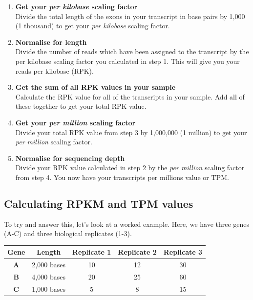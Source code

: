 \documentclass[11pt]{article}
\begin{document}
\begin{enumerate}
\def\labelenumi{\arabic{enumi}.}
\item
  \textbf{Get your \textit{per kilobase} scaling factor}\\
  Divide the total length of the exons in your transcript in base pairs
  by 1,000 (1 thousand) to get your \textit{per kilobase} scaling factor.
\item
  \textbf{Normalise for length}\\
  Divide the number of reads which have been assigned to the transcript
  by the per kilobase scaling factor you calculated in step 1. This will
  give you your reads per kilobase (RPK).
\item
  \textbf{Get the sum of all RPK values in your sample}\\
  Calculate the RPK value for all of the transcripts in your sample. Add
  all of these together to get your total RPK value.
\item
  \textbf{Get your \textit{per million} scaling factor}\\
  Divide your total RPK value from step 3 by 1,000,000 (1 million) to
  get your \textit{per million} scaling factor.
\item
  \textbf{Normalise for sequencing depth}\\
  Divide your RPK value calculated in step 2 by the \textit{per million}
  scaling factor from step 4. You now have your transcripts per millions
  value or TPM.
\end{enumerate}

\newpage

    \hypertarget{calculating-rpkm-and-tpm-values}{%
\subsection{Calculating RPKM and TPM
values}\label{calculating-rpkm-and-tpm-values}}

To try and answer this, let's look at a worked example. Here, we have
three genes (A-C) and three biological replicates (1-3).

\begin{longtable}[]{@{}ccccc@{}}
\toprule
Gene & Length & Replicate 1 & Replicate 2 & Replicate 3\tabularnewline
\midrule
\endhead
\textbf{A} & 2,000 bases & 10 & 12 & 30\tabularnewline
\textbf{B} & 4,000 bases & 20 & 25 & 60\tabularnewline
\textbf{C} & 1,000 bases & 5 & 8 & 15\tabularnewline
\bottomrule
\end{longtable}
\end{document}

